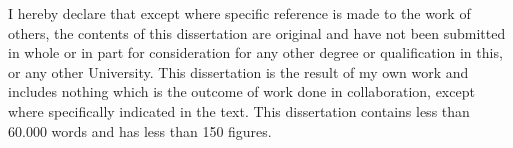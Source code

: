 
\begin{declaration}

I hereby declare that except where specific reference is made to the work of others, the contents of this dissertation are original and have not been submitted in whole or in part for consideration for any other degree or qualification in this, or any other University. This dissertation is the result of my own work and includes nothing which is the outcome of work done in collaboration, except where specifically indicated in the text. This dissertation contains less than 60.000 words 
and has less than 150 figures.


\end{declaration}

